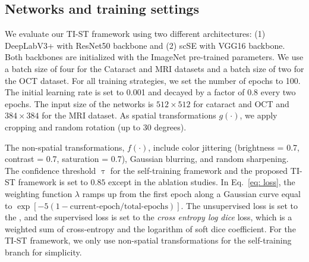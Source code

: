 \subsection{Networks and training settings}
We evaluate our TI-ST framework using two different architectures:  (1) DeepLabV3+ with ResNet50 backbone and (2) scSE with VGG16 backbone. Both backbones are initialized with the ImageNet pre-trained parameters. We use a batch size of four for the Cataract and MRI datasets and a batch size of two for the OCT dataset. For all training strategies, we set the number of epochs to 100. The initial learning rate is set to 0.001 and decayed by a factor of $0.8$ every two epochs. The input size of the networks is $512\times 512$ for cataract and OCT and $384\times 384$ for the MRI dataset. 
As spatial transformations $g(\cdot)$, we apply cropping and random rotation (up to 30 degrees). 

The non-spatial transformations, $f(\cdot)$, include color jittering (brightness = 0.7, contrast = 0.7, saturation = 0.7), Gaussian blurring, and random sharpening. The confidence threshold $\uptau$ for the self-training framework and the proposed TI-ST framework is set to $0.85$ except in the ablation studies. In Eq.~\eqref{eq: loss}, the weighting function $\lambda$ ramps up from the first epoch along a Gaussian curve equal to $\exp[-5(1-\text{current-epoch}/{\text{total-epochs}})]$. The unsupervised loss is set to the , and the supervised loss is set to the \textit{cross entropy log dice} loss, which is a weighted sum of cross-entropy and the logarithm of soft dice coefficient. For the TI-ST framework, we only use non-spatial transformations for the self-training branch for simplicity.

